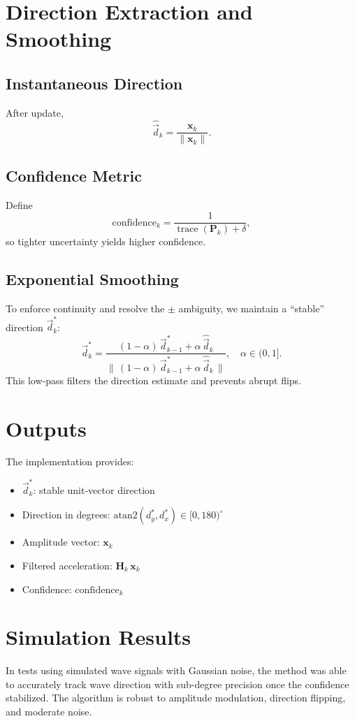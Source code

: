 \documentclass[11pt,letterpaper]{article}
\begin{document}
\section{Direction Extraction and Smoothing}
\subsection{Instantaneous Direction}
After update,
\[
\widehat{\vec{d}}_k
= \frac{\bm{x}_k}{\|\bm{x}_k\|}.
\]

\subsection{Confidence Metric}
Define
\[
\mathrm{confidence}_k
= \frac{1}{\operatorname{trace}(\bm{P}_k) + \delta},
\]
so tighter uncertainty yields higher confidence.

\subsection{Exponential Smoothing}
To enforce continuity and resolve the \(\pm\) ambiguity, we maintain a “stable” direction \(\vec{d}^*_k\):
\[
\vec{d}^*_k
= \frac{(1-\alpha)\,\vec{d}^*_{k-1} + \alpha\,\widehat{\vec{d}}_k}
       {\bigl\|\,(1-\alpha)\,\vec{d}^*_{k-1} + \alpha\,\widehat{\vec{d}}_k\,\bigr\|},
\quad \alpha\in(0,1].
\]
This low‐pass filters the direction estimate and prevents abrupt flips.

\section{Outputs}
The implementation provides:
\begin{itemize}
  \item \(\vec{d}^*_k\): stable unit‐vector direction
  \item Direction in degrees: \(\mathrm{atan2}(d^*_y,d^*_x)\in[0,180)^\circ\)
  \item Amplitude vector: \(\bm{x}_k\)
  \item Filtered acceleration: \(\bm{H}_k\,\bm{x}_k\)
  \item Confidence: \(\mathrm{confidence}_k\)
\end{itemize}

\section{Simulation Results}
In tests using simulated wave signals with Gaussian noise, the method was able to accurately track wave direction with sub-degree precision once the confidence stabilized. The algorithm is robust to amplitude modulation, direction flipping, and moderate noise.
\end{document}
